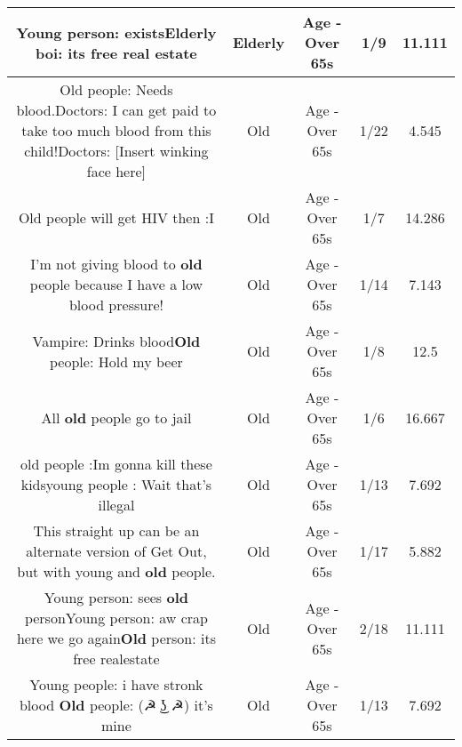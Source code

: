 \documentclass[11pt]{article}
\newlength\mylength
\begin{document}
\begin{center}
\begin{longtable}{|C{.65\mylength}|C{.30\mylength}|C{.12\mylength}|C{.12\mylength}|C{.12\mylength}|}
  \small Young person: exists\textbf{Elderly} boi: its free real estate\normalsize   & Elderly & Age - Over 65s & 1/9 & 11.111 \\  \hline
  \small Old people: Needs blood.Doctors: I can get paid to take too much blood from this child!Doctors: [Insert winking face here]\normalsize   & Old & Age - Over 65s & 1/22 & 4.545 \\  \hline
  \small Old people will get HIV then :I\normalsize   & Old & Age - Over 65s & 1/7 & 14.286 \\  \hline
  \small I'm not giving blood to \textbf{old} people because I have a low blood pressure!\normalsize   & Old & Age - Over 65s & 1/14 & 7.143 \\  \hline
  \small Vampire: Drinks blood\textbf{Old} people: Hold my beer\normalsize   & Old & Age - Over 65s & 1/8 & 12.5 \\  \hline
  \small All \textbf{old} people go to jail\normalsize   & Old & Age - Over 65s & 1/6 & 16.667 \\  \hline
  \small old people :Im gonna kill these kidsyoung people : Wait that's illegal\normalsize   & Old & Age - Over 65s & 1/13 & 7.692 \\  \hline
  \small This straight up can be an alternate version of Get Out, but with young and \textbf{old} people.\normalsize   & Old & Age - Over 65s & 1/17 & 5.882 \\  \hline
  \small Young person: sees \textbf{old} personYoung person: aw crap here we go again\textbf{Old} person: its free realestate\normalsize   & Old & Age - Over 65s & 2/18 & 11.111 \\  \hline
  \small Young people: i have stronk blood \textbf{Old} people: (☭ ͜ʖ ☭) it's mine\normalsize   & Old & Age - Over 65s & 1/13 & 7.692 \\  \hline

\end{longtable}
\end{center}
\end{document}
